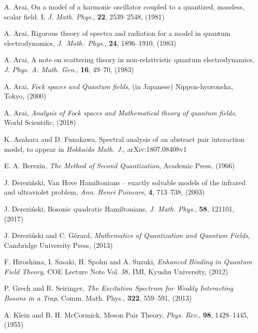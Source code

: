 \documentclass[12pt]{article}
\theoremstyle{plain}
\numberwithin{equation}{section}
\theoremstyle{remark}
\begin{document}
{\small
\begin{thebibliography}{00}

 {A. Arai},
 {On a model of a harmonic oscillator coupled to a quantized, massless, scalar field. I},
 \textit{J. Math. Phys.}, \textbf{22}, 2539--2548, (1981)

 {A. Arai},
 {Rigorous theory of spectra and radiation for a model in quantum electrodynamics},
 \textit{J.~Math.~Phys.}, {\bf 24}, 1896--1910, (1983)
 
{A. Arai},
 {A note on scattering theory in non-relativistic quantum electrodynamics},
 \textit{J. Phys. A: Math. Gen.}, {\bf16}, 49--70, (1983)
 
 {A. Arai},
 \textit{Fock spaces and Quantum fields},
 (in Japanese) Nippon-hyoronsha, Tokyo, (2000)
 
  {A. Arai},
  \textit{Analysis of Fock spaces and Mathematical theory of quantum fields},
  {World Scientific}, (2018)

 {K. Asahara and D. Funakawa},
 {Spectral analysis of an abstract pair interaction model}, 
 to appear in \textit{Hokkaido Math. J.}, arXiv:1807.08408v1

  {E. A. Berezin},
  \textit{The Method of Second Quantization},
  {Academic Press}, (1966)

   {J. Derezi\'{n}ski},
   {Van Hove Hamiltonians -- exactly solvable models of the infrared and ultraviolet problem},
   \textit{Ann. Henri Poincare}, \textbf{4}, 713--738, (2003)

  {J. Derezi\'{n}ski},
  {Bosonic quadratic Hamiltonians},
  \textit{J. Math. Phys.}, \textbf{58}, 121101, (2017)

  {J. Derezi\'{n}ski and C. G\'{e}rard},
  \textit{Mathematics of Quantization and Quantum Fields},
  {Cambridge University Press}, (2013)

  {F. Hiroshima, I. Sasaki, H. Spohn and A. Suzuki}, 
  \textit{Enhanced Binding in Quantum Field Theory}, 
  {COE Lecture Note Vol. 38}, IMI, Kyushu University, (2012)

  {P. Grech and R. Seiringer},
  \textit{The Excitation Spectrum for Weakly Interacting Bosons in a Trap},
  {Comm. Math. Phys.}, \textbf{322}, 559--591, (2013)

  {A. Klein and B. H. McCormick},
  {Meson Pair Theory}, 
  \textit{Phys. Rev.}, \textbf{98}, 1428--1445, (1955)


\end{thebibliography}}
\end{document}

